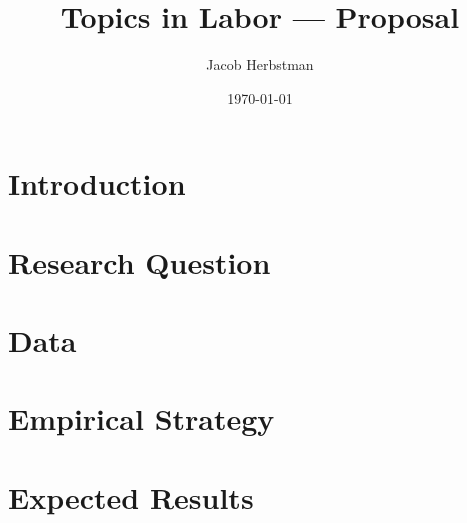 \documentclass{article}
\title{Topics in Labor --- Proposal}
\author{Jacob Herbstman}
\date{\today}
\begin{document}
\maketitle

\section*{Introduction}



\section*{Research Question}



\section*{Data}



\section*{Empirical Strategy}



\section*{Expected Results}





\end{document}
